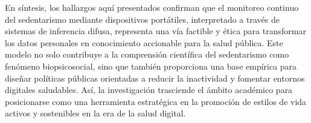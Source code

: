 En síntesis, los hallazgos aquí presentados confirman que el monitoreo continuo del sedentarismo mediante dispositivos portátiles, interpretado a través de sistemas de inferencia difusa, representa una vía factible y ética para transformar los datos personales en conocimiento accionable para la salud pública. Este modelo no solo contribuye a la comprensión científica del sedentarismo como fenómeno biopsicosocial, sino que también proporciona una base empírica para diseñar políticas públicas orientadas a reducir la inactividad y fomentar entornos digitales saludables. Así, la investigación trasciende el ámbito académico para posicionarse como una herramienta estratégica en la promoción de estilos de vida activos y sostenibles en la era de la salud digital.

%
%

